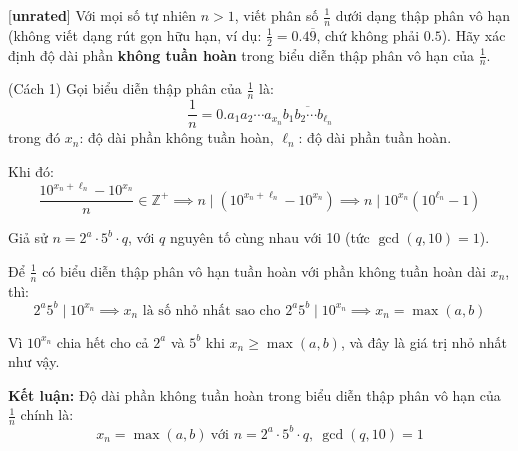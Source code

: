 \documentclass[../01-divisibility.tex]{subfiles}
\begin{document}
\begin{example*}\label{example:IND-2015-N2}[\textbf{unrated}]
	Với mọi số tự nhiên \( n > 1 \), viết phân số \( \frac{1}{n} \) dưới dạng thập phân vô hạn (không viết dạng rút gọn hữu hạn,
	ví dụ: \( \frac{1}{2} = 0.4\overline{9} \), chứ không phải \( 0.5 \)).
	Hãy xác định độ dài phần \textbf{không tuần hoàn} trong biểu diễn thập phân vô hạn của \( \frac{1}{n} \).
\end{example*}

\begin{soln}(Cách 1)\footnotemark
	Gọi biểu diễn thập phân của \( \frac{1}{n} \) là:
	\[
		\frac{1}{n} = 0.a_1a_2 \cdots a_{x_n} \overline{b_1b_2 \cdots b_{\ell_n}}
	\]
	trong đó \( x_n \): độ dài phần không tuần hoàn, \( \ell_n \): độ dài phần tuần hoàn.
	
	Khi đó:
	\[
		\frac{10^{x_n + \ell_n} - 10^{x_n}}{n} \in \mathbb{Z}^+
		\implies n \mid \left(10^{x_n + \ell_n} - 10^{x_n}\right)
		\implies n \mid 10^{x_n}(10^{\ell_n} - 1)
	\]
	
	Giả sử \( n = 2^a \cdot 5^b \cdot q \), với \( q \) nguyên tố cùng nhau với 10 (tức \( \gcd(q,10)=1 \)).
	
	Để \( \frac{1}{n} \) có biểu diễn thập phân vô hạn tuần hoàn với phần không tuần hoàn dài \( x_n \), thì:
	\[
		2^a 5^b \mid 10^{x_n}
		\implies x_n \text{ là số nhỏ nhất sao cho } 2^a 5^b \mid 10^{x_n}
		\implies x_n = \max(a, b)
	\]
	
	Vì \( 10^{x_n} \) chia hết cho cả \( 2^a \) và \( 5^b \) khi \( x_n \geq \max(a, b) \), và đây là giá trị nhỏ nhất như vậy.
	
	\textbf{Kết luận:} Độ dài phần không tuần hoàn trong biểu diễn thập phân vô hạn của \( \frac{1}{n} \) chính là:
	\[
		x_n = \max(a, b)\ \text{với } n = 2^a \cdot 5^b \cdot q,~ \gcd(q, 10) = 1
	\]	
\end{soln}

\end{document}
